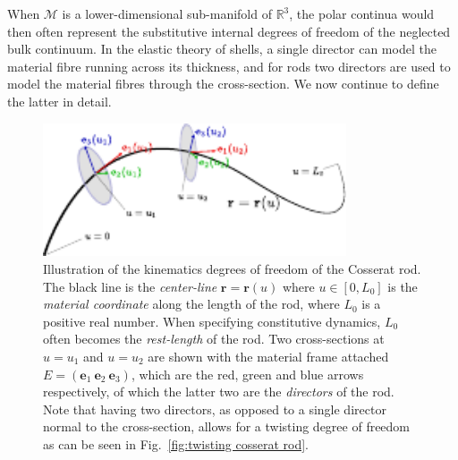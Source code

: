 When $\mathcal{M}$ is a lower-dimensional sub-manifold of $\mathbb{R}^3$, the polar continua would then often represent the substitutive internal degrees of freedom of the neglected bulk continuum. In the elastic theory of shells, a single director can model the material fibre running across its thickness, and for rods two directors are used to model the material fibres through the cross-section. We now continue to define the latter in detail.

\begin{figure}[t]
\centering
        \includegraphics[width=0.8\textwidth]{figs_part2/cosserat_kinematics/cosserat_cross_section.pdf}
        \caption{Illustration of the kinematics degrees of freedom of the Cosserat rod. The black line is the \textit{center-line} $\mathbf{r}=\mathbf{r}(u)$ where $u \in [0,L_0]$ is the \textit{material coordinate} along the length of the rod, where $L_0$ is a positive real number. When specifying constitutive dynamics, $L_0$ often becomes the \textit{rest-length} of the rod. Two cross-sections at $u=u_1$ and $u=u_2$ are shown with the material frame attached $E = (\mathbf{e}_1\ \mathbf{e}_2\ \mathbf{e}_3)$, which are the red, green and blue arrows respectively, of which the latter two are the \textit{directors} of the rod. Note that having two directors, as opposed to a single director normal to the cross-section, allows for a twisting degree of freedom as can be seen in Fig.~\ref{fig:twisting cosserat rod}.}
        \label{fig:Cosserat kinematic degrees of freedom}
\end{figure}

